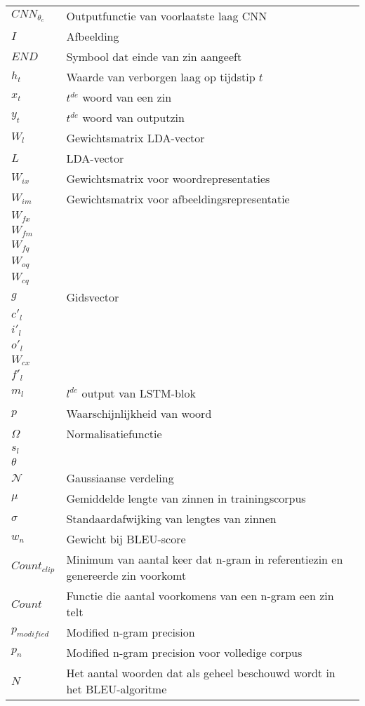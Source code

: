 \documentclass[master=cws,masteroption=ai]{kulemt}
\begin{document}
	\begin{flushleft}
		\renewcommand{\arraystretch}{1.1}
		\begin{tabularx}{\textwidth}{@{}p{25mm}X@{}}
	$CNN_{\theta_c} $& Outputfunctie van voorlaatste laag CNN \\
	$I$         & Afbeelding\\
	$END$       & Symbool dat einde van zin aangeeft\\
	$h_t$		& Waarde van verborgen laag op tijdstip $t$\\
	$x_t$       & $t^{de}$ woord van een zin\\
	$y_t$		& $t^{de}$ woord van outputzin\\
	$W_l$		& Gewichtsmatrix LDA-vector\\
	$L$			& LDA-vector\\
	$W_{ix}$    & Gewichtsmatrix voor woordrepresentaties\\
	$W_{im}$	& Gewichtsmatrix voor afbeeldingsrepresentatie\\
	$W_{fx}$    & \\
	$W_{fm}$	&\\
	$W_{fq}$	&\\
	$W_{oq}$	&\\
	$W_{cq}$	&\\
	$g$			& Gidsvector\\
	$c'_l$		&\\
	$i'_l$		&\\
	$o'_l$		&\\
	$W_{cx}$	&\\
	$f'_l$		&\\
	$m_l$		& $l^{de}$ output van LSTM-blok\\
	$p$			& Waarschijnlijkheid van woord\\
	$\Omega$     & Normalisatiefunctie\\
	$s_l$		& \\
	$\theta$	&\\
	$\mathcal{N}$& Gaussiaanse verdeling\\
	$\mu$		& Gemiddelde lengte van zinnen in trainingscorpus\\
	$\sigma$    & Standaardafwijking van lengtes van zinnen\\
	$w_n$		& Gewicht bij BLEU-score\\
	$Count_{clip}$& Minimum van aantal keer dat n-gram in referentiezin en genereerde zin voorkomt\\
	$Count$     & Functie die aantal voorkomens van een n-gram een zin telt\\
	$p_{modified}$ & Modified n-gram precision\\
	$p_n$       & Modified n-gram precision voor volledige corpus\\
	$N$         & Het aantal woorden dat als geheel beschouwd wordt in het BLEU-algoritme\\
	
		  \end{tabularx}
		\end{flushleft}
		
\end{document}
